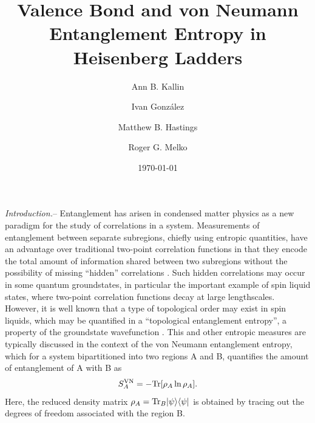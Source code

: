 \documentclass[prl,aps,twocolumn,floatfix,amsmath,amssymb,superscriptaddress,tightenlines]{revtex4}
\begin{document}
\date{\today}
\title{Valence Bond and von Neumann Entanglement Entropy in Heisenberg Ladders}
\author{Ann B. Kallin}

\author{Ivan Gonz\'alez}

\author{Matthew B. Hastings}

\author{Roger G. Melko}

\begin{abstract}

\end{abstract}
\maketitle


{\it Introduction.}-- Entanglement has arisen in condensed matter physics as a new paradigm for the study of correlations in a system.  Measurements of entanglement between separate subregions, chiefly using entropic quantities, have an advantage over traditional two-point correlation functions in that they encode the total amount of information shared between two subregions without the possibility of missing ``hidden'' correlations \cite{wolf}.  Such hidden correlations may occur in some quantum groundstates,  in particular the important example of spin liquid states, where two-point correlation functions decay at large lengthscales.  However, it is well known that a type of topological order may exist in spin liquids, which may be quantified in a ``topological entanglement entropy'', a property of the groundstate wavefunction \cite{ KP, LW}.  This and other entropic measures are typically discussed in the context of the von Neumann entanglement entropy, which for a system bipartitioned into two regions A and B, quantifies the amount of entanglement of A with B as
\begin{equation}
S^{\rm VN}_A = - {\rm Tr} [ \rho_A \ln \rho_A ].
\end{equation}
Here, the reduced density matrix $\rho_A = {\rm Tr}_B | \psi \rangle \langle \psi |$ is obtained by tracing out the degrees of freedom associated with the region B.
\end{document}
